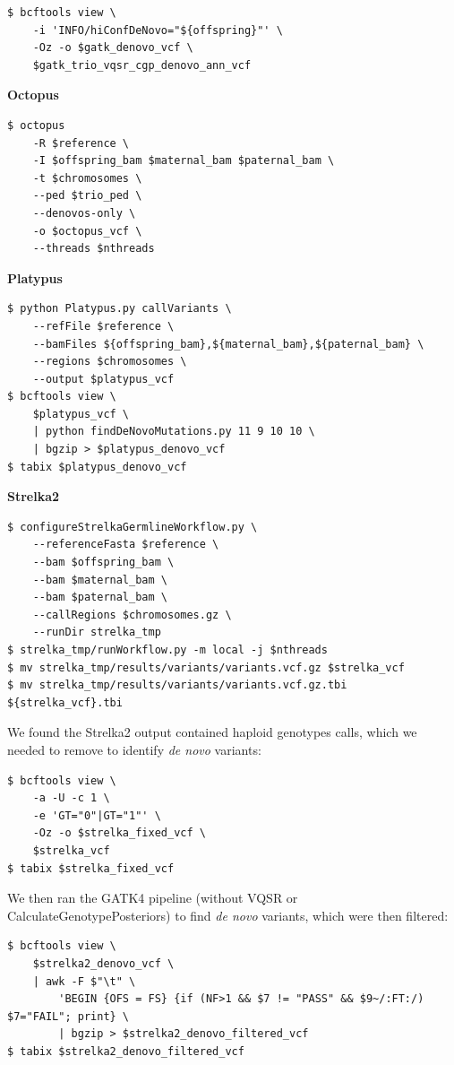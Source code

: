 \documentclass{article}
\begin{document}
\begin{lstlisting}
$ bcftools view \
    -i 'INFO/hiConfDeNovo="${offspring}"' \
    -Oz -o $gatk_denovo_vcf \
    $gatk_trio_vqsr_cgp_denovo_ann_vcf
\end{lstlisting}

\noindent \textbf{Octopus}

\begin{lstlisting}
$ octopus
    -R $reference \
    -I $offspring_bam $maternal_bam $paternal_bam \
    -t $chromosomes \
    --ped $trio_ped \
    --denovos-only \
    -o $octopus_vcf \
    --threads $nthreads
\end{lstlisting}

\noindent \textbf{Platypus}

\begin{lstlisting}
$ python Platypus.py callVariants \
    --refFile $reference \
    --bamFiles ${offspring_bam},${maternal_bam},${paternal_bam} \
    --regions $chromosomes \
    --output $platypus_vcf
$ bcftools view \
    $platypus_vcf \
    | python findDeNovoMutations.py 11 9 10 10 \
    | bgzip > $platypus_denovo_vcf
$ tabix $platypus_denovo_vcf
\end{lstlisting}

\noindent \textbf{Strelka2}

\begin{lstlisting}
$ configureStrelkaGermlineWorkflow.py \
    --referenceFasta $reference \
    --bam $offspring_bam \
    --bam $maternal_bam \
    --bam $paternal_bam \
    --callRegions $chromosomes.gz \
    --runDir strelka_tmp
$ strelka_tmp/runWorkflow.py -m local -j $nthreads
$ mv strelka_tmp/results/variants/variants.vcf.gz $strelka_vcf
$ mv strelka_tmp/results/variants/variants.vcf.gz.tbi ${strelka_vcf}.tbi
\end{lstlisting}

We found the Strelka2 output contained haploid genotypes calls, which we needed to remove to identify \textit{de novo} variants: 

\begin{lstlisting}
$ bcftools view \
    -a -U -c 1 \
    -e 'GT="0"|GT="1"' \
    -Oz -o $strelka_fixed_vcf \
    $strelka_vcf
$ tabix $strelka_fixed_vcf
\end{lstlisting}

We then ran the GATK4 pipeline (without VQSR or CalculateGenotypePosteriors) to find \textit{de novo} variants, which were then filtered:

\begin{lstlisting}
$ bcftools view \
    $strelka2_denovo_vcf \
    | awk -F $"\t" \
        'BEGIN {OFS = FS} {if (NF>1 && $7 != "PASS" && $9~/:FT:/) $7="FAIL"; print} \
        | bgzip > $strelka2_denovo_filtered_vcf
$ tabix $strelka2_denovo_filtered_vcf
\end{lstlisting}
\end{document}
